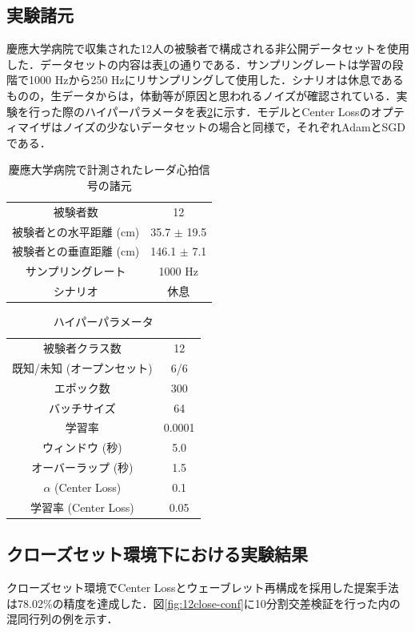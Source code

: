 \subsection{実験諸元}
慶應大学病院で収集された12人の被験者で構成される非公開データセットを使用した．データセットの内容は表\ref{table:keio_hospital}の通りである．サンプリングレートは学習の段階で1000 Hzから250 Hzにリサンプリングして使用した．シナリオは休息であるものの，生データからは，体動等が原因と思われるノイズが確認されている．実験を行った際のハイパーパラメータを表\ref{table:12-parameter}に示す．モデルとCenter Lossのオプティマイザはノイズの少ないデータセットの場合と同様で，それぞれAdamとSGDである．

\begin{table}[H]
  \caption{慶應大学病院で計測されたレーダ心拍信号の諸元}
  \centering
  \begin{tabular}{cc}
  \hline
  被験者数 & 12 \\
  被験者との水平距離 (cm) & 35.7 $\pm$ 19.5 \\
  被験者との垂直距離 (cm) & 146.1 $\pm$ 7.1 \\
  サンプリングレート & 1000 Hz \\
  シナリオ & 休息 \\
  \hline
  \end{tabular}
  \label{table:keio_hospital}
\end{table}

\begin{table}[H]
  \caption{ハイパーパラメータ}
  \centering
  \begin{tabular}{cc}
  \hline
  被験者クラス数 & 12 \\
  既知/未知 (オープンセット) & 6/6 \\
  エポック数 & 300 \\
  バッチサイズ & 64 \\
  学習率 & 0.0001 \\
  ウィンドウ (秒) & 5.0 \\
  オーバーラップ (秒) & 1.5 \\
  $\alpha$ (Center Loss) & 0.1 \\
  学習率 (Center Loss) & 0.05 \\
  \hline
  \end{tabular}
  \label{table:12-parameter}
\end{table}

\subsection{クローズセット環境下における実験結果}
クローズセット環境でCenter Lossとウェーブレット再構成を採用した提案手法は78.02\%の精度を達成した．図\ref{fig:12close-conf}に10分割交差検証を行った内の混同行列の例を示す．


